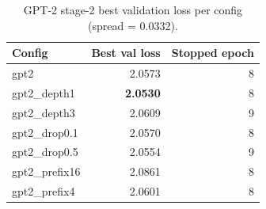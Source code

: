 \begin{table}[ht]
\centering
\caption{GPT-2 stage-2 best validation loss per config (spread = 0.0332).}
\label{tab:s2_valloss_gpt2}
\footnotesize
\begin{tabular}{lrr}
\toprule
Config & Best val loss & Stopped epoch \\
\midrule
gpt2 & 2.0573 & 8 \\
gpt2\_depth1 & \textbf{2.0530} & 8 \\
gpt2\_depth3 & 2.0609 & 9 \\
gpt2\_drop0.1 & 2.0570 & 8 \\
gpt2\_drop0.5 & 2.0554 & 9 \\
gpt2\_prefix16 & 2.0861 & 8 \\
gpt2\_prefix4 & 2.0601 & 8 \\
\bottomrule
\end{tabular}
\end{table}
